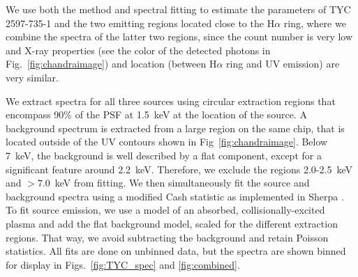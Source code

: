\documentclass[linenumbers]{aastex631}
\begin{document}
We use both the \citet{2010ApJ...708.1760G} method and spectral fitting to estimate the parameters of TYC 2597-735-1 and the two emitting regions located close to the H$\alpha$ ring, where we combine the spectra of the latter two regions, since the count number is very low and X-ray properties (see the color of the detected photons in Fig.~\ref{fig:chandraimage}) and location (between H$\alpha$ ring and UV emission) are very similar.

We extract spectra for all three sources using circular extraction regions that encompass 90\% of the PSF at 1.5~keV at the location of the source. A background spectrum is extracted from a large region on the same chip, that is located outside of the UV contours shown in Fig~\ref{fig:chandraimage}. Below 7~keV, the background is well described by a flat component, except for a significant feature around 2.2~keV. Therefore, we exclude the regions 2.0-2.5~keV and $>7.0$~keV from fitting. We then simultaneously fit the source and background spectra using a modified Cash statistic \citep{1979ApJ...228..939C} as implemented in Sherpa \citep{2007ASPC..376..543D,doug_burke_2021_4428938}. To fit source emission, we use a model of an absorbed, collisionally-excited plasma \citep[APEC model,][]{2012ApJ...756..128F} and add the flat background model, scaled for the different extraction regions. That way, we avoid subtracting the background and retain Poisson statistics. All fits are done on unbinned data, but the spectra are shown binned for display in Figs.~\ref{fig:TYC_spec} and \ref{fig:combined}.
\end{document}
